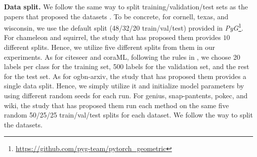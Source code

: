 \smallskip\noindent\textbf{Data split. }
We follow the same way to split training/validation/test sets as the papers that proposed the datasets \cite{hu2020ogb,lim2021large,platonov2023a}.
To be concrete, for cornell, texas, and wisconsin, we use the default split (48/32/20 train/val/test) provided in \textit{PyG}\footnote{\url{https://github.com/pyg-team/pytorch_geometric}}. 
For chameleon and squirrel, the study \cite{platonov2023a} that has proposed them provides $10$ different splits. Hence, we utilize five different splits from them in our experiments. 
As for citeseer and coraML, following the rules in \cite{zhang2021magnet}, we choose 20 labels per class for the training set, 500 labels for the validation set, and the rest for the test set. 
As for ogbn-arxiv, the study \cite{hu2020ogb} that has proposed them provides a single data split. 
Hence, we simply utilize it and initialize model parameters by using different random seeds for each run. 
For genius, snap-pantents, pokec, and wiki, the study \cite{lim2021large} that has proposed them  run each method on the same five random 50/25/25 train/val/test splits for each dataset. 
We follow the way to split the datasets. 

